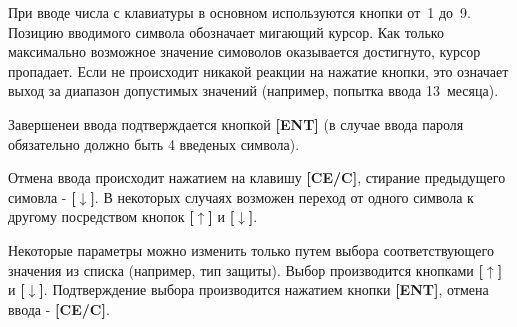 При вводе числа с клавиатуры в основном используются кнопки от~1 до~9. Позицию вводимого символа обозначает мигающий курсор. Как только максимально возможное значение симоволов оказывается достигнуто, курсор пропадает. Если не происходит никакой реакции на нажатие кнопки, это означает выход за диапазон допустимых значений (например, попытка ввода 13~месяца).

Завершенеи ввода подтверждается кнопкой \textbf{[ENT]} (в случае ввода пароля обязательно должно быть 4 введеных символа).

Отмена ввода происходит нажатием на клавишу \textbf{[CE/C]}, стирание предыдущего симовла - \textbf{[$\downarrow$]}. В некоторых случаях возможен переход от одного символа к другому посредством кнопок \textbf{[$\uparrow$]} и \textbf{[$\downarrow$]}.

Некоторые параметры можно изменить только путем выбора соответствующего значения из списка (например, тип защиты). Выбор производится кнопками \textbf{[$\uparrow$]} и \textbf{[$\downarrow$]}. Подтверждение выбора производится нажатием кнопки \textbf{[ENT]}, отмена ввода - \textbf{[CE/C]}.
